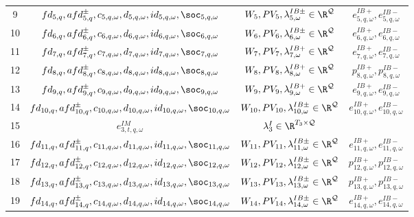 \begin{table}[H]
\begin{tabular}{c c c c}
	9& $fd_{5,q}, afd^{\pm}_{5,q}, c_{5,q, \omega}, d_{5,q, \omega}, id_{5,q, \omega}, \soc_{5,q, \omega}$ & $W_5, PV_5, \lambda^{IB\pm}_{5, \omega} \in \R^\mathcal{Q}$ & $e^{IB+}_{5,q, \omega}, e^{IB-}_{5,q, \omega}$\\
	10& $fd_{6,q}, afd^{\pm}_{6,q}, c_{6, q,\omega}, d_{6, q,\omega}, id_{6, q,\omega}, \soc_{6,q, \omega}$& $W_6, PV_6, \lambda^{IB\pm}_{6, \omega} \in \R^\mathcal{Q}$& $e^{IB+}_{6,q, \omega}, e^{IB-}_{6, q,\omega}$\\
	11& $fd_{7,q}, afd^{\pm}_{7,q}, c_{7, q,\omega}, d_{7, q,\omega}, id_{7, q,\omega}, \soc_{7,q, \omega}$& $W_7, PV_7, \lambda^{IB+}_{7, \omega} \in \R^\mathcal{Q}$& $e^{IB+}_{7,q, \omega}, e^{IB-}_{7,q, \omega}$\\
	12& $fd_{8,q}, afd^{\pm}_{8,q}, c_{8,q, \omega}, d_{8,q, \omega}, id_{8,q, \omega}, \soc_{8,q, \omega}$ & $W_8, PV_8, \lambda^{IB+}_{8, \omega} \in \R^\mathcal{Q}$ & $p^{IB+}_{8,q, \omega}, p^{IB-}_{8,q, \omega}$ \\
	13& $fd_{9,q}, afd^{\pm}_{9,q}, c_{9,q, \omega}, d_{9,q, \omega}, id_{9,q, \omega}, \soc_{9,q, \omega}$ & $W_9, PV_9, \lambda^{IB+}_{9, \omega} \in \R^\mathcal{Q}$ & $e^{IB+}_{9,q, \omega}, e^{IB-}_{9,q, \omega}$\\
	14& $fd_{10,q}, afd^{\pm}_{10,q}, c_{10,q, \omega}, d_{10,q, \omega}, id_{10,q, \omega}, \soc_{10,q, \omega}$ & $W_{10}, PV_{10}, \lambda^{IB\pm}_{10, \omega} \in \R^\mathcal{Q}$ & $e^{IB+}_{10,q, \omega}, e^{IB-}_{10,q, \omega}$\\
 15& $e^{IM}_{3, t, q, \omega}$ & $\lambda^I_3 \in \R^{T_3 \times \mathcal{Q}}$&\\
	16& $fd_{11,q}, afd^{\pm}_{11,q}, c_{11,q, \omega}, d_{11,q, \omega}, id_{11,q, \omega}, \soc_{11,q, \omega}$ & $W_{11}, PV_{11}, \lambda^{IB\pm}_{11, \omega} \in \R^\mathcal{Q}$ & $e^{IB+}_{11,q, \omega}, e^{IB-}_{11,q, \omega}$\\
	17& $fd_{12,q}, afd^{\pm}_{12,q}, c_{12,q, \omega}, d_{12,q, \omega}, id_{12,q, \omega}, \soc_{12,q, \omega}$ & $W_{12}, PV_{12}, \lambda^{IB\pm}_{12, \omega} \in \R^\mathcal{Q}$ & $p^{IB+}_{12,q, \omega}, p^{IB-}_{12,q, \omega}$ \\
	18& $fd_{13,q}, afd^{\pm}_{13,q}, c_{13,q, \omega}, d_{13,q, \omega}, id_{13,q, \omega}, \soc_{13,q, \omega}$ & $W_{13}, PV_{13}, \lambda^{IB\pm}_{13, \omega} \in \R^\mathcal{Q}$ & $p^{IB+}_{13,q, \omega}, p^{IB-}_{13,q, \omega}$ \\
	19& $fd_{14,q}, afd^{\pm}_{14,q}, c_{14,q, \omega}, d_{14,q, \omega}, id_{14,q, \omega}, \soc_{14,q, \omega}$ & $W_{14}, PV_{14}, \lambda^{IB\pm}_{14, \omega} \in \R^\mathcal{Q}$ & $e^{IB+}_{14,q, \omega}, e^{IB-}_{14,q, \omega}$\\

\end{tabular}
\end{table}
